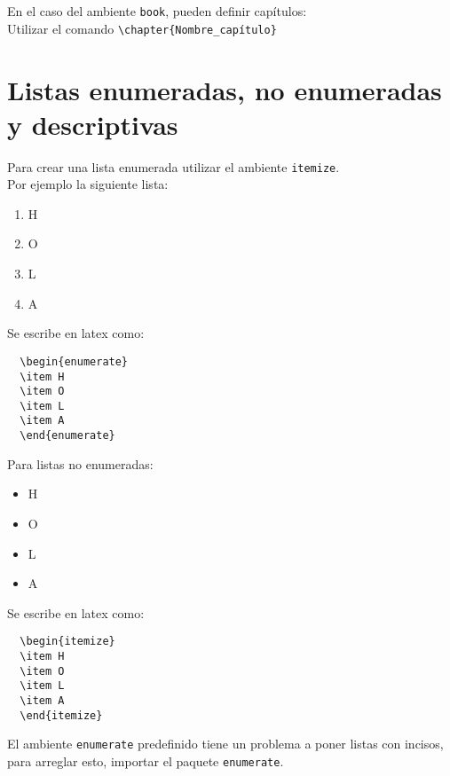 \documentclass[spanish,12pt,letterpaper]{article}
\theoremstyle{break}
\begin{document}
                  En el caso del ambiente \verb!book!, pueden definir capítulos:\\
                  Utilizar el comando \verb!\chapter{Nombre_capítulo}!

                  \section{Listas enumeradas, no enumeradas y descriptivas}
                  Para crear una lista enumerada utilizar el ambiente \texttt{itemize}.\\
                  Por ejemplo la siguiente lista:
                  \begin{enumerate}
                  \item H
                  \item O
                  \item L
                  \item A
                  \end{enumerate}
                  Se escribe en latex como:
\begin{verbatim}
  \begin{enumerate}
  \item H
  \item O
  \item L
  \item A
  \end{enumerate}
\end{verbatim}
Para listas no enumeradas:
\begin{itemize}
\item H
\item O
\item L
\item A
\end{itemize}
Se escribe en latex como:
\begin{verbatim}
  \begin{itemize}
  \item H
  \item O
  \item L
  \item A
  \end{itemize}
\end{verbatim}
El ambiente \texttt{enumerate} predefinido tiene un problema a poner listas con incisos,
para arreglar esto, importar el paquete \texttt{enumerate}.\\
\end{document}
